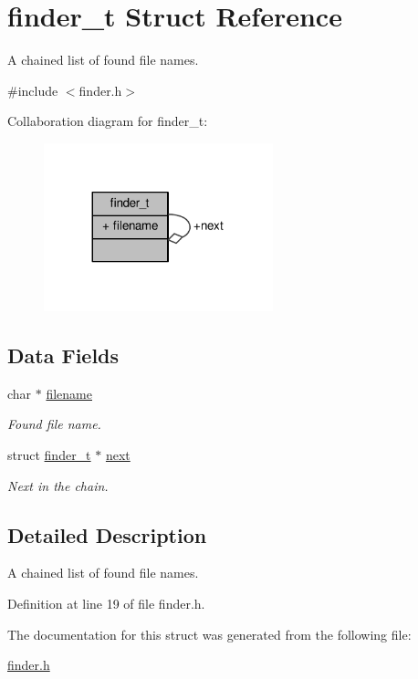 \hypertarget{structfinder__t}{}\section{finder\+\_\+t Struct Reference}
\label{structfinder__t}


A chained list of found file names.  




{\ttfamily \#include $<$finder.\+h$>$}



Collaboration diagram for finder\+\_\+t\+:\nopagebreak
\begin{figure}[H]
\begin{center}
\leavevmode
\includegraphics[width=188pt]{structfinder__t__coll__graph}
\end{center}
\end{figure}
\subsection*{Data Fields}
\begin{DoxyCompactItemize}
\item 
char $\ast$ \hyperlink{structfinder__t_aeac90097f29f7529968697163cea5c18}{filename}\hypertarget{structfinder__t_aeac90097f29f7529968697163cea5c18}{}\label{structfinder__t_aeac90097f29f7529968697163cea5c18}

\begin{DoxyCompactList}\small\item\em Found file name. \end{DoxyCompactList}\item 
struct \hyperlink{structfinder__t}{finder\+\_\+t} $\ast$ \hyperlink{structfinder__t_a7db9cac9324009990f14b7f84bf47d3c}{next}\hypertarget{structfinder__t_a7db9cac9324009990f14b7f84bf47d3c}{}\label{structfinder__t_a7db9cac9324009990f14b7f84bf47d3c}

\begin{DoxyCompactList}\small\item\em Next in the chain. \end{DoxyCompactList}\end{DoxyCompactItemize}


\subsection{Detailed Description}
A chained list of found file names. 

Definition at line 19 of file finder.\+h.



The documentation for this struct was generated from the following file\+:\begin{DoxyCompactItemize}
\item 
\hyperlink{finder_8h}{finder.\+h}\end{DoxyCompactItemize}
